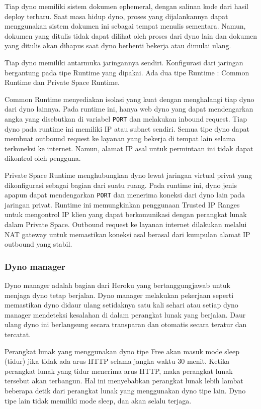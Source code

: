 Tiap dyno memiliki sistem dokumen ephemeral, dengan salinan kode dari hasil deploy terbaru. Saat masa hidup dyno, proses yang dijalankannya dapat menggunakan sistem dokumen ini sebagai tempat menulis sementara. Namun, dokumen yang ditulis tidak dapat dilihat oleh proses dari dyno lain dan dokumen yang ditulis akan dihapus saat dyno berhenti bekerja atau dimulai ulang.

Tiap dyno memiliki antarmuka jaringannya sendiri. Konfigurasi dari jaringan bergantung pada tipe Runtime yang dipakai. Ada dua tipe Runtime : Common Runtime dan Private Space Runtime. 

Common Runtime menyediakan isolasi yang kuat dengan menghalangi tiap dyno dari dyno lainnya. Pada runtime ini, hanya web dyno yang dapat mendengarkan angka yang disebutkan di variabel \texttt{\textdollar PORT} dan melakukan inbound request. Tiap dyno pada runtime ini memiliki IP atau subnet sendiri. Semua tipe dyno dapat membuat outbound request ke layanan yang bekerja di tempat lain selama terkoneksi ke internet. Namun, alamat IP asal untuk permintaan ini tidak dapat dikontrol oleh pengguna.

Private Space Runtime menghubungkan dyno lewat jaringan virtual privat yang dikonfigurasi sebagai bagian dari suatu ruang. Pada runtime ini, dyno jenis apapun dapat mendengarkan \texttt{\textdollar PORT} dan menerima koneksi dari dyno lain pada jaringan privat. Runtime ini memungkinkan penggunaan Trusted IP Ranges untuk mengontrol IP klien yang dapat berkomunikasi dengan perangkat lunak dalam Private Space. Outbound request ke layanan internet dilakukan melalui NAT gateway untuk memastikan koneksi asal berasal dari kumpulan alamat IP outbound yang stabil.

\subsubsection{Dyno manager}
Dyno manager adalah bagian dari Heroku yang bertanggungjawab untuk menjaga dyno tetap berjalan. Dyno manager melakukan pekerjaan seperti memastikan dyno didaur ulang setidaknya satu kali sehari atau setiap dyno manager mendeteksi kesalahan di dalam perangkat lunak yang berjalan. Daur ulang dyno ini berlangsung secara transparan dan otomatis secara teratur dan tercatat.

Perangkat lunak yang menggunakan dyno tipe Free akan masuk mode sleep (tidur) jika tidak ada arus HTTP selama jangka waktu 30 menit. Ketika perangkat lunak yang tidur menerima arus HTTP, maka perangkat lunak tersebut akan terbangun. Hal ini menyebabkan perangkat lunak lebih lambat beberapa detik dari perangkat lunak yang menggunakan dyno tipe lain. Dyno tipe lain tidak memiliki mode sleep, dan akan selalu terjaga.

